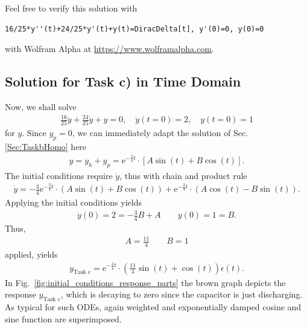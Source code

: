 \documentclass[a4paper,11pt,oneside]{scrartcl}
\begin{document}
Feel free to verify this solution with
\begin{verbatim}
16/25*y''(t)+24/25*y'(t)+y(t)=DiracDelta[t], y'(0)=0, y(0)=0
\end{verbatim}
with Wolfram Alpha at \url{https://www.wolframalpha.com}.











\subsection{Solution for Task c) in Time Domain}
Now, we shall solve
\begin{align}
\frac{16}{25} \ddot{y} + \frac{24}{25} \dot{y} + y = 0,
\quad \dot{y}(t=0) = 2,\quad y(t=0)=1
\end{align}
for $y$.
%
Since $y_p=0$, we can immediately adapt the solution of Sec.
\ref{Sec:TaskbHomo} here
%
\begin{align}
y = y_h + y_p = \mathrm{e}^{-\frac{3}{4} t} \cdot
\left[ A \sin(t) + B \cos(t)\right].
\end{align}
%
The initial conditions require $\dot{y}$, thus with chain and product rule
%
\begin{align}
\dot{y} =
-\frac{3}{4} \mathrm{e}^{-\frac{3}{4} t} \cdot
\left( A \sin(t) + B \cos(t)\right)
+
\mathrm{e}^{-\frac{3}{4} t} \cdot
\left( A \cos(t) - B \sin(t)\right).
\end{align}
%
Applying the initial conditions yields
%
\begin{align}
\dot{y}(0) = 2 =
-\frac{3}{4}  B
+
A\qquad
y(0) = 1 =
B.
\end{align}
Thus,
\begin{align}
A = \frac{11}{4}\qquad B = 1
\end{align}
applied, yields
\begin{align}
\boxed{
y_\text{Task c} = \mathrm{e}^{-\frac{3}{4} t} \cdot
\left( \frac{11}{4} \sin(t) + \cos(t)\right) \epsilon(t).
}
\end{align}
In Fig.~\ref{fig:initial_conditions_response_parts} the brown graph depicts the
response $y_\text{Task c}$, which is decaying to zero since the capacitor is
just discharging. As typical for such ODEs, again
weighted and exponentially damped cosine and sine function are superimposed.
\end{document}
